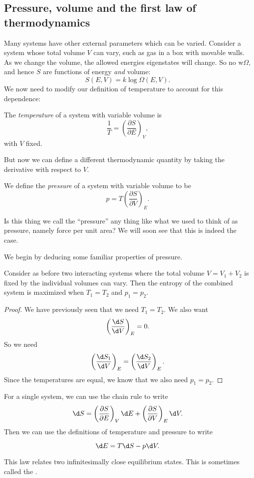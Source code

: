\documentclass[a4paper]{article}
\begin{document}
\subsection{Pressure, volume and the first law of thermodynamics}
Many systems have other external parameters which can be varied. Consider a system whose total volume $V$ can vary, such as gas in a box with movable walls. As we change the volume, the allowed energies eigenstates will change. So no w$\Omega$, and hence $S$ are functions of energy \emph{and} volume:
\[
  S(E, V) = k \log \Omega(E, V).
\]
We now need to modify our definition of temperature to account for this dependence:
\begin{defi}[Temperature]
  The \emph{temperature} of a system with variable volume is
  \[
    \frac{1}{T} = \left(\frac{\partial S}{\partial E}\right)_V,
  \]
  with $V$ fixed.
\end{defi}

But now we can define a different thermodynamic quantity by taking the derivative with respect to $V$.

\begin{defi}[Pressure]
  We define the \emph{pressure} of a system with variable volume to be
  \[
    p = T \left(\frac{\partial S}{\partial V}\right)_E.
  \]
\end{defi}
Is this thing we call the ``pressure'' any thing like what we used to think of as pressure, namely force per unit area? We will soon see that this is indeed the case.


We begin by deducing some familiar properties of pressure.
\begin{prop}
  Consider as before two interacting systems where the total volume $V = V_1 + V_2$ is fixed by the individual volumes can vary. Then the entropy of the combined system is maximized when $T_1 = T_2$ and $p_1 = p_2$.
\end{prop}

\begin{proof}
  We have previously seen that we need $T_1 = T_2$. We also want
  \[
    \left(\frac{\d S}{\d V}\right)_E = 0.
  \]
  So we need
  \[
    \left(\frac{\d S_1}{\d V}\right)_E = \left(\frac{\d S_2}{\d V}\right)_E.
  \]
  Since the temperatures are equal, we know that we also need $p_1 = p_2$.
\end{proof}

For a single system, we can use the chain rule to write
\[
  \d S = \left(\frac{\partial S}{\partial E}\right)_V \d E + \left(\frac{\partial S}{\partial V}\right)_E \d V.
\]
Then we can use the definitions of temperature and pressure to write
\begin{prop}
  \[
    \d E = T \d S - p \d V.
  \]
\end{prop}
This law relates two infinitesimally close equilibrium states. This is sometimes called the .
\end{document}
